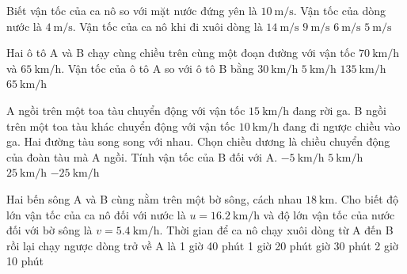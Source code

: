 \begin{ex}
	Biết vận tốc của ca nô so với mặt nước đứng yên là $\SI{10}{\meter/\second}$. Vận tốc của dòng nước là $\SI{4}{\meter/\second}$. Vận tốc của ca nô khi đi xuôi dòng là
	\choice
	{\True $\SI{14}{\meter/\second}$}
	{$\SI{9}{\meter/\second}$}
	{$\SI{6}{\meter/\second}$}
	{$\SI{5}{\meter/\second}$}
	\loigiai{
	}
\end{ex}
\begin{ex}
	Hai ô tô A và B chạy cùng chiều trên cùng một đoạn đường với vận tốc $\SI{70}{\kilo\meter/\hour}$ và $\SI{65}{\kilo\meter/\hour}$. Vận tốc của ô tô A so với ô tô B bằng
	\choice
	{$\SI{30}{\kilo\meter/\hour}$}
	{\True $\SI{5}{\kilo\meter/\hour}$}
	{$\SI{135}{\kilo\meter/\hour}$}
	{$\SI{65}{\kilo\meter/\hour}$}
	\loigiai{
	}
\end{ex}
\begin{ex}
	A ngồi trên một toa tàu chuyển động với vận tốc $\SI{15}{\kilo\meter/\hour}$ đang rời ga. B ngồi trên một toa tàu khác chuyển động với vận tốc $\SI{10}{\kilo\meter/\hour}$ đang đi ngược chiều vào ga. Hai đường tàu song song với nhau. Chọn chiều dương là chiều chuyển động của đoàn tàu mà A ngồi. Tính vận tốc của B đối với A.
	\choice
	{$\SI{-5}{\kilo\meter/\hour}$}
	{$\SI{5}{\kilo\meter/\hour}$}
	{$\SI{25}{\kilo\meter/\hour}$}
	{\True $\SI{-25}{\kilo\meter/\hour}$}
\end{ex}
\begin{ex}
	Hai bến sông A và B cùng nằm trên một bờ sông, cách nhau $\SI{18}{\kilo\meter}$. Cho biết độ lớn vận tốc của ca nô đối với nước là $u =\SI{16.2}{\kilo\meter/\hour}$ và độ lớn vận tốc của nước đối với bờ sông là $v=\SI{5.4}{\kilo\meter/\hour}$. Thời gian để ca nô chạy xuôi dòng từ A đến B rồi lại chạy ngược dòng trở về A là
	\choice
	{1 giờ 40 phút}
	{1 giờ 20 phút}
	{ giờ 30 phút}
	{2 giờ 10 phút}
\end{ex}
